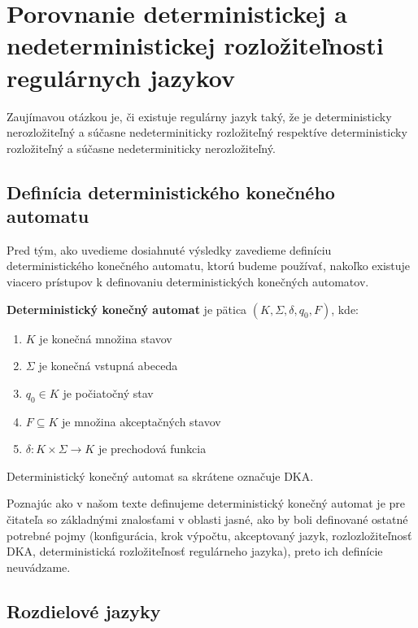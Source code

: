 \chapter[Porovnanie determinizmu a nedeterminizmu]{Porovnanie deterministickej a nedeterministickej rozložiteľnosti regulárnych jazykov}
\label{kap:det_vs_ndet}

Zaujímavou otázkou je, či existuje regulárny jazyk taký, že je deterministicky nerozložiteľný a súčasne nedeterminiticky rozložiteľný respektíve deterministicky rozložiteľný a súčasne nedeterminiticky nerozložiteľný.

\section{Definícia deterministického konečného automatu}

Pred tým, ako uvedieme dosiahnuté výsledky zavedieme definíciu deterministického konečného automatu, ktorú budeme používať, nakoľko existuje viacero prístupov k definovaniu deterministických konečných automatov.

\begin{definition}
\textbf{Deterministický konečný automat} je pätica $ (K, \Sigma, \delta, q_0, F) $, kde:
\begin{enumerate}  
\item $ K $ je konečná množina stavov
\item $ \Sigma $ je konečná vstupná abeceda
\item $ q_0 \in K $ je počiatočný stav
\item $ F \subseteq K $ je množina akceptačných stavov
\item $ \delta : K \times \Sigma \rightarrow K $ je prechodová funkcia
\end{enumerate}
\end{definition}

\begin{note}
Deterministický konečný automat sa skrátene označuje DKA.
\end{note}

Poznajúc ako v našom texte definujeme deterministický konečný automat je pre čitateľa so základnými znalosťami v oblasti jasné, ako by boli definované ostatné potrebné pojmy (konfigurácia, krok výpočtu, akceptovaný jazyk, rozlozložiteľnosť DKA, deterministická rozložiteľnosť regulárneho jazyka), preto ich definície neuvádzame.

\section{Rozdielové jazyky}

